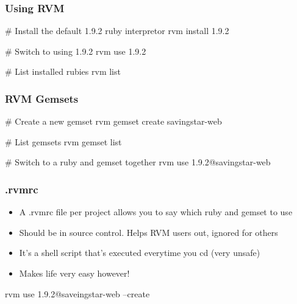 \begin{frame}[fragile]
  \frametitle{Using RVM}
  \begin{console}
    # Install the default 1.9.2 ruby interpretor
    rvm install 1.9.2

    # Switch to using 1.9.2
    rvm use 1.9.2

    # List installed rubies
    rvm list
  \end{console}
\end{frame}

\begin{frame}[fragile]
  \frametitle{RVM Gemsets}
  \begin{console}
    # Create a new gemset
    rvm gemset create savingstar-web

    # List gemsets
    rvm gemset list

    # Switch to a ruby and gemset together
    rvm use 1.9.2@savingstar-web
  \end{console}
\end{frame}

\begin{frame}[fragile]
  \frametitle{.rvmrc}
  \begin{itemize}
  \item A .rvmrc file per project allows you to say which ruby and gemset to use
  \pause
  \item Should be in source control. Helps RVM users out, ignored for others
  \pause
  \item It's a shell script that's executed everytime you cd (very unsafe)
  \pause
  \item Makes life very easy however!
  \end{itemize}
  \pause
  \begin{rubycode}
    rvm use 1.9.2@saveingstar-web --create
  \end{rubycode}
\end{frame}


